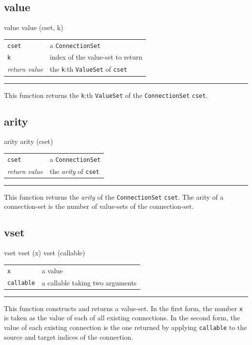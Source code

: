 \documentclass[a4paper,twoside]{report}
\makeatletter
\newenvironment{parameters}%
{\begin{tabular}{@{\hspace{2em}}lp{0.6\textwidth}}}%
{\end{tabular}\par\vspace{1mm}\par\hrule\par\vspace{5mm}}
\newcommand{\fa}[1]{\lstinline|#1|}
\makeatother
\begin{document}
\subsection{value}

\begin{head}{value}
  value (cset, k)
\end{head}
\begin{parameters}
  \lstinline|cset| &%
  a \lstinline|ConnectionSet|\\
  \lstinline|k| &%
  index of the value-set to return\\
  \emph{return value} &%
  the \lstinline|k|:th \lstinline|ValueSet| of \lstinline|cset|\\
\end{parameters}
This function returns the \lstinline|k|:th \lstinline|ValueSet| of the
\lstinline|ConnectionSet| \lstinline|cset|.

\subsection{arity}

\begin{head}{arity}
  arity (cset)
\end{head}
\begin{parameters}
  \lstinline|cset| &%
  a \lstinline|ConnectionSet|\\
  \emph{return value} &%
  the \emph{arity} of \lstinline|cset|\\
\end{parameters}
This function returns the \emph{arity} of the
\lstinline|ConnectionSet| \lstinline|cset|.  The arity of a
connection-set is the number of value-sets of the connection-set.

\subsection{vset}

\begin{head}{vset}
  vset (x)
  vset (callable)
\end{head}
\begin{parameters}
  \lstinline|x| &%
  a value\\
  \lstinline|callable| &%
  a callable taking two arguments\\
\end{parameters}
This function constructs and returns a value-set.  In the first form,
the number \fa{x} is taken as the value of each of all existing
connections.  In the second form, the value of each existing
connection is the one returned by applying \fa{callable} to the source
and target indices of the connection.
\end{document}
